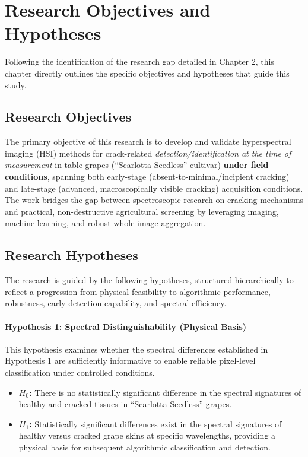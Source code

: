 \chapter{Research Objectives and Hypotheses}
\label{chap:objectives_hypotheses}

\medskip
\noindent
Following the identification of the research gap detailed in Chapter 2, this chapter directly outlines the specific objectives and hypotheses that guide this study.

\section{Research Objectives}

\noindent
The primary objective of this research is to develop and validate hyperspectral imaging (HSI) methods for crack-related \textit{detection/identification at the time of measurement} in table grapes (``Scarlotta Seedless'' cultivar) \textbf{under field conditions}, spanning both early-stage (absent-to-minimal/incipient cracking) and late-stage (advanced, macroscopically visible cracking) acquisition conditions. The work bridges the gap between spectroscopic research on cracking mechanisms and practical, non-destructive agricultural screening by leveraging imaging, machine learning, and robust whole-image aggregation.

\section{Research Hypotheses}

\noindent
The research is guided by the following hypotheses, structured hierarchically to reflect a progression from physical feasibility to algorithmic performance, robustness, early detection capability, and spectral efficiency.

\subsubsection{Hypothesis 1: Spectral Distinguishability (Physical Basis)}
\label{hyp:spectral_distinguishability}

\noindent
This hypothesis examines whether the spectral differences established in Hypothesis 1 are sufficiently informative to enable reliable pixel-level classification under controlled conditions.

\begin{itemize}
    \item \textbf{$H_0$:} There is no statistically significant difference in the spectral signatures of healthy and cracked tissues in ``Scarlotta Seedless'' grapes.
    \item \textbf{$H_1$:} Statistically significant differences exist in the spectral signatures of healthy versus cracked grape skins at specific wavelengths, providing a physical basis for subsequent algorithmic classification and detection.
\end{itemize}


